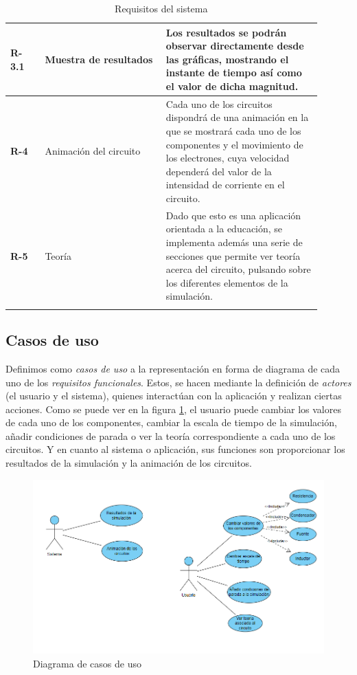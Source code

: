 \documentclass[../main.tex]{subfiles}
\begin{document}
\begin{longtable}{|| p{0.1\linewidth} | p{0.35\linewidth} |  p{0.45\linewidth} ||}
            \textbf{R-3.1} & Muestra de resultados & Los resultados se podrán observar directamente desde las gráficas, mostrando el instante de tiempo así como el valor de dicha magnitud. \\ \hline
            
            \textbf{R-4} & Animación del circuito & Cada uno de los circuitos dispondrá de una animación en la que se mostrará cada uno de los componentes y el movimiento de los electrones, cuya velocidad dependerá del valor de la intensidad de corriente en el circuito. \\ \hline
            
            \textbf{R-5} & Teoría & Dado que esto es una aplicación orientada a la educación, se implementa además una serie de secciones que permite ver teoría acerca del circuito, pulsando sobre los diferentes elementos de la simulación. \\ \hline
            
            
            
            
            \caption{Requisitos del sistema}
            \label{tab::requisitos}
            
        \end{longtable}


\subsection{Casos de uso}
Definimos como \textit{casos de uso} a la representación en forma de diagrama de cada uno de los \textit{requisitos funcionales}. Estos, se hacen mediante la definición de \textit{actores} (el usuario y el sistema), quienes interactúan con la aplicación y realizan ciertas acciones. Como se puede ver en la figura \ref{fig::casos_de_uso}, el usuario puede cambiar los valores de cada uno de los componentes, cambiar la escala de tiempo de la simulación, añadir condiciones de parada o ver la teoría correspondiente a cada uno de los circuitos. Y en cuanto al sistema o aplicación, sus funciones son proporcionar los resultados de la simulación y la animación de los circuitos.

\begin{figure}[!h]
    \centering
    \includegraphics{images/casos_de_uso.PNG}
    \caption{Diagrama de casos de uso}
    \label{fig::casos_de_uso}
\end{figure}
\end{document}
